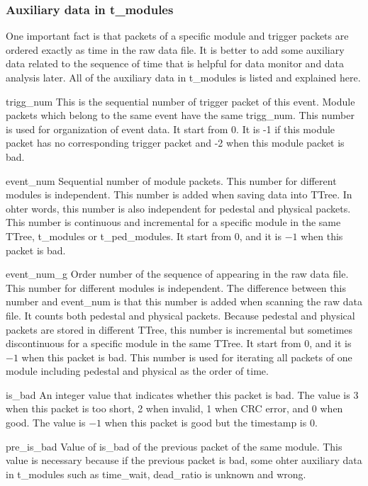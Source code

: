 \documentclass[a4paper, 12pt, onecolumn]{article}
\begin{document}
\subsubsection{Auxiliary data in t\_modules}
One important fact is that packets of a specific module and trigger packets are ordered exactly as time in the raw data file.
It is better to add some auxiliary data related to the sequence of time that is helpful for data monitor and data analysis later.
All of the auxiliary data in t\_modules is listed and explained here.

\begin{asparadesc}
\item[trigg\_num] This is the sequential number of trigger packet of this event. Module packets which belong to the same event have the same trigg\_num.
  This number is used for organization of event data. It start from 0. It is -1 if this module packet has no corresponding trigger packet and -2 when this module packet is bad.
\item[event\_num] Sequential number of module packets. This number for different modules is independent. This number is added when saving data into TTree.
  In ohter words, this number is also independent for pedestal and physical packets.
  This number is continuous and incremental for a specific module in the same TTree, t\_modules or t\_ped\_modules.
  It start from 0, and it is $-1$ when this packet is bad.
\item[event\_num\_g] Order number of the sequence of appearing in the raw data file. This number for different modules is independent.
  The difference between this number and event\_num is that this number is added when scanning the raw data file. It counts both pedestal and physical packets.
  Because pedestal and physical packets are stored in different TTree, this number is incremental but sometimes discontinuous for a specific module in the same TTree.
  It start from 0, and it is $-1$ when this packet is bad. This number is used for iterating all packets of one module including pedestal and physical as the order of time.
\item[is\_bad] An integer value that indicates whether this packet is bad. The value is 3 when this packet is too short, 2 when invalid, 1 when CRC error, and 0 when good.
  The value is $-1$ when this packet is good but the timestamp is 0.
\item[pre\_is\_bad] Value of is\_bad of the previous packet of the same module.
  This value is necessary because if the previous packet is bad, some ohter auxiliary data in t\_modules such as time\_wait, dead\_ratio is unknown and wrong.

\end{asparadesc}
\end{document}
